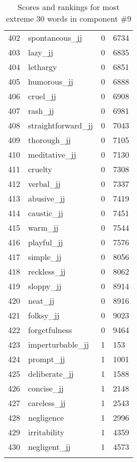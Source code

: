 \begin{longtable}[!htbp]{| rlr@{.}l |}
    402 & spontaneous\_jj & 0 & 6734 \\
    403 & lazy\_jj & 0 & 6835 \\
    404 & lethargy & 0 & 6851 \\
    405 & humorous\_jj & 0 & 6888 \\
    406 & cruel\_jj & 0 & 6908 \\
    407 & rash\_jj & 0 & 6981 \\
    408 & straightforward\_jj & 0 & 7043 \\
    409 & thorough\_jj & 0 & 7105 \\
    410 & meditative\_jj & 0 & 7130 \\
    411 & cruelty & 0 & 7308 \\
    412 & verbal\_jj & 0 & 7337 \\
    413 & abusive\_jj & 0 & 7419 \\
    414 & caustic\_jj & 0 & 7451 \\
    415 & warm\_jj & 0 & 7544 \\
    416 & playful\_jj & 0 & 7576 \\
    417 & simple\_jj & 0 & 8056 \\
    418 & reckless\_jj & 0 & 8062 \\
    419 & sloppy\_jj & 0 & 8914 \\
    420 & neat\_jj & 0 & 8916 \\
    421 & folksy\_jj & 0 & 9023 \\
    422 & forgetfulness & 0 & 9464 \\
    423 & imperturbable\_jj & 1 & 153 \\
    424 & prompt\_jj & 1 & 1001 \\
    425 & deliberate\_jj & 1 & 1588 \\
    426 & concise\_jj & 1 & 2148 \\
    427 & careless\_jj & 1 & 2543 \\
    428 & negligence & 1 & 2996 \\
    429 & irritability & 1 & 4359 \\
    430 & negligent\_jj & 1 & 4573 \\
    \hline
    \caption{Scores and rankings for most extreme 30 words in component \#9} \\
\end{longtable}

